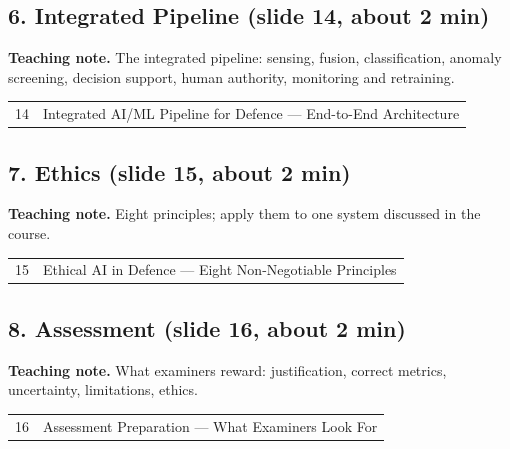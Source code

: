 \documentclass[11pt]{article}
\begin{document}
\subsection{6. Integrated Pipeline \normalfont\small\color{GreyN}(slide 14, about 2 min)}

\textbf{Teaching note.} The integrated pipeline: sensing, fusion, classification, anomaly screening, decision support, human authority, monitoring and retraining.

\begin{center}\small\renewcommand{\arraystretch}{1.1}\begin{tabularx}{\textwidth}{@{}r X@{}}14 & Integrated AI/ML Pipeline for Defence --- End-to-End Architecture\\\end{tabularx}\end{center}

\subsection{7. Ethics \normalfont\small\color{GreyN}(slide 15, about 2 min)}

\textbf{Teaching note.} Eight principles; apply them to one system discussed in the course.

\begin{center}\small\renewcommand{\arraystretch}{1.1}\begin{tabularx}{\textwidth}{@{}r X@{}}15 & Ethical AI in Defence --- Eight Non-Negotiable Principles\\\end{tabularx}\end{center}

\subsection{8. Assessment \normalfont\small\color{GreyN}(slide 16, about 2 min)}

\textbf{Teaching note.} What examiners reward: justification, correct metrics, uncertainty, limitations, ethics.

\begin{center}\small\renewcommand{\arraystretch}{1.1}\begin{tabularx}{\textwidth}{@{}r X@{}}16 & Assessment Preparation --- What Examiners Look For\\\end{tabularx}\end{center}
\end{document}
